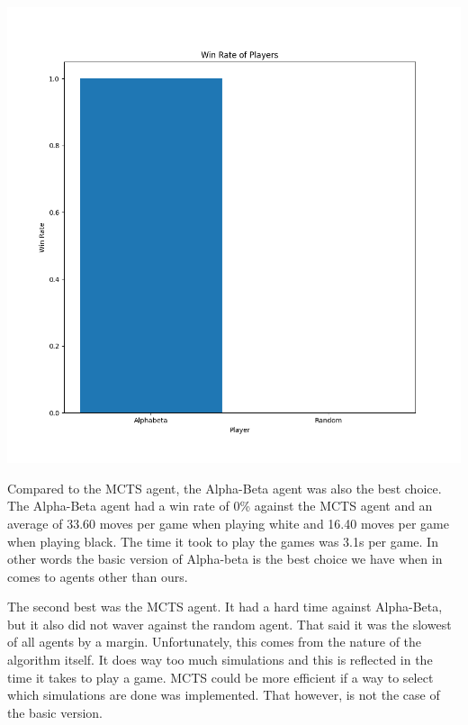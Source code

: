 \documentclass[11pt,a4paper]{report}
\begin{document}
\begin{answers}[20cm]
    
    \includegraphics[scale=.35]{graphs/abvsrand.png}


    Compared to the MCTS agent, the Alpha-Beta agent was also the best choice. The Alpha-Beta agent had a win rate of 0\% against the MCTS agent and an average of
    33.60 moves per game when playing white and 16.40 moves per game when playing black. The time it took to play the games was 3.1s per game. In other words the basic 
    version of Alpha-beta is the best choice we have when in comes to agents other than ours.

    
\end{answers}

\begin{answers}[23cm]
    The second best was the MCTS agent. It had a hard time against Alpha-Beta, but it also did not waver against the random agent. That said it was the slowest of all agents by a margin. 
    Unfortunately, this comes from the nature of the algorithm itself. It does way too much simulations and this is reflected in the time it takes to play a game. 
    MCTS could be more efficient if a way to select which simulations are done was implemented. That however, is not the case of the basic
    version. 

\end{answers}
\end{document}

